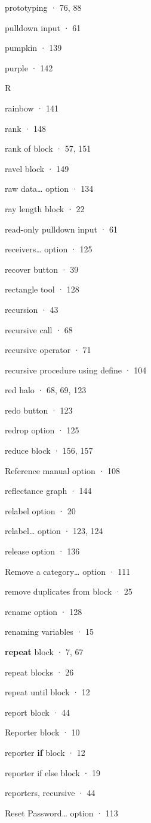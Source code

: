 prototyping · 76, 88

pulldown input · 61

pumpkin · 139

purple · 142

R

rainbow · 141

rank · 148

rank of block · 57, 151

ravel block · 149

raw data\ldots{} option · 134

ray length block · 22

read-only pulldown input · 61

receivers\ldots{} option · 125

recover button · 39

rectangle tool · 128

recursion · 43

recursive call · 68

recursive operator · 71

recursive procedure using define · 104

red halo · 68, 69, 123

redo button · 123

redrop option · 125

reduce block · 156, 157

Reference manual option · 108

reflectance graph · 144

relabel option · 20

relabel\ldots{} option · 123, 124

release option · 136

Remove a category\ldots{} option · 111

remove duplicates from block · 25

rename option · 128

renaming variables · 15

\textbf{repeat} block · 7, 67

repeat blocks · 26

repeat until block · 12

report block · 44

Reporter block · 10

reporter \textbf{if} block · 12

reporter if else block · 19

reporters, recursive · 44

Reset Password\ldots{} option · 113

